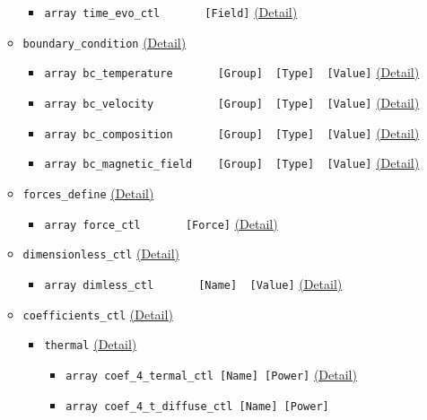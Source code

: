 \begin{itemize}
\begin{itemize}
		\begin{itemize}
		\item \verb|array time_evo_ctl       [Field]|
	    		\hyperref[href_t:time_evo_ctl]{(Detail)}
		\end{itemize}
%
	\item \verb|boundary_condition|
		\label{href_i:boundary_condition}
    		\hyperref[href_t:boundary_condition]{(Detail)}
		\begin{itemize}
		\item \verb|array bc_temperature       [Group]  [Type]  [Value]|
	    		\hyperref[href_t:bc_temperature]{(Detail)}
		\item \verb|array bc_velocity          [Group]  [Type]  [Value]|
	    		\hyperref[href_t:bc_velocity]{(Detail)}
		\item \verb|array bc_composition       [Group]  [Type]  [Value]|
	    		\hyperref[href_t:bc_composition]{(Detail)}
		\item \verb|array bc_magnetic_field    [Group]  [Type]  [Value]|
	    		\hyperref[href_t:bc_magnetic_field]{(Detail)}
		\end{itemize}
%
	\item \verb|forces_define|
    		\label{href_i:forces_define}
    		\hyperref[href_t:forces_define]{(Detail)}
		\begin{itemize}
		\item \verb|array force_ctl       [Force]|
	    		\hyperref[href_t:force_ctl]{(Detail)}
		\end{itemize}
%
	\item \verb|dimensionless_ctl|
		\label{href_i:dimensionless_ctl}
    		\hyperref[href_t:dimensionless_ctl]{(Detail)}
		\begin{itemize}
		\item \verb|array dimless_ctl       [Name]  [Value]|
	    		\hyperref[href_t:dimless_ctl]{(Detail)}
		\end{itemize}
%
	\item \verb|coefficients_ctl|
		\label{href_i:coefficients_ctl}
    		\hyperref[href_t:coefficients_ctl]{(Detail)}
		\begin{itemize}
		\item \verb|thermal|
			\label{href_i:thermal}
	    		\hyperref[href_t:thermal]{(Detail)}
			\begin{itemize}
			\item \verb|array coef_4_termal_ctl [Name] [Power]|
		    		\hyperref[href_t:coef_4_termal_ctl]{(Detail)}
			\item \verb|array coef_4_t_diffuse_ctl [Name] [Power]|

\end{itemize}
\end{itemize}
\end{itemize}
\end{itemize}
